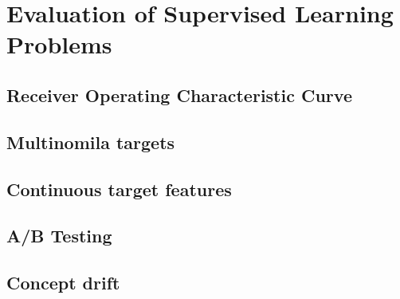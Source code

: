 \section{Evaluation of Supervised Learning Problems}




\subsection{Receiver Operating Characteristic Curve}
\subsection{Multinomila targets}
\subsection{Continuous target features}
\subsection{A/B Testing}
\subsection{Concept drift}
